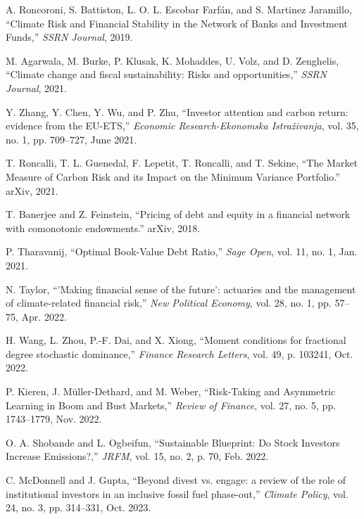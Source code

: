 \documentclass[conference]{IEEEtran}
\begin{document}
\begin{thebibliography}{00}
 A. Roncoroni, S. Battiston, L. O. L. Escobar Farfán, and S. Martinez Jaramillo, ``Climate Risk and Financial Stability in the Network of Banks and Investment Funds,'' \textit{SSRN Journal}, 2019.

 M. Agarwala, M. Burke, P. Klusak, K. Mohaddes, U. Volz, and D. Zenghelis, ``Climate change and fiscal sustainability: Risks and opportunities,'' \textit{SSRN Journal}, 2021.

 Y. Zhang, Y. Chen, Y. Wu, and P. Zhu, ``Investor attention and carbon return: evidence from the EU-ETS,'' \textit{Economic Research-Ekonomska Istraživanja}, vol. 35, no. 1, pp. 709--727, June 2021.

 T. Roncalli, T. L. Guenedal, F. Lepetit, T. Roncalli, and T. Sekine, ``The Market Measure of Carbon Risk and its Impact on the Minimum Variance Portfolio.'' arXiv, 2021.

 T. Banerjee and Z. Feinstein, ``Pricing of debt and equity in a financial network with comonotonic endowments.'' arXiv, 2018.

 P. Tharavanij, ``Optimal Book-Value Debt Ratio,'' \textit{Sage Open}, vol. 11, no. 1, Jan. 2021.

 N. Taylor, ``'Making financial sense of the future': actuaries and the management of climate-related financial risk,'' \textit{New Political Economy}, vol. 28, no. 1, pp. 57--75, Apr. 2022.

 H. Wang, L. Zhou, P.-F. Dai, and X. Xiong, ``Moment conditions for fractional degree stochastic dominance,'' \textit{Finance Research Letters}, vol. 49, p. 103241, Oct. 2022.

 P. Kieren, J. Müller-Dethard, and M. Weber, ``Risk-Taking and Asymmetric Learning in Boom and Bust Markets,'' \textit{Review of Finance}, vol. 27, no. 5, pp. 1743--1779, Nov. 2022.

 O. A. Shobande and L. Ogbeifun, ``Sustainable Blueprint: Do Stock Investors Increase Emissions?,'' \textit{JRFM}, vol. 15, no. 2, p. 70, Feb. 2022.

 C. McDonnell and J. Gupta, ``Beyond divest vs. engage: a review of the role of institutional investors in an inclusive fossil fuel phase-out,'' \textit{Climate Policy}, vol. 24, no. 3, pp. 314--331, Oct. 2023.


\end{thebibliography}
\end{document}
